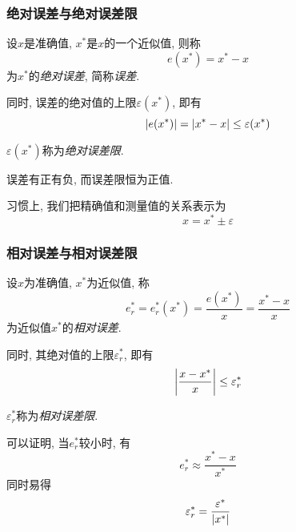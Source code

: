 \subsubsection{绝对误差与绝对误差限}
\begin{definition}[绝对误差与绝对误差限]
    设$x$是准确值, $x^*$是$x$的一个近似值, 则称
    \begin{equation*}
        e(x^*)=x^*-x
    \end{equation*}
    为$x^*$的\emph{绝对误差}, 简称\emph{误差}.

    同时, 误差的绝对值的上限$\varepsilon(x^*)$, 即有
    \begin{equation*}
        \abs{e(x^*)}=\abs{x^*-x}\le\varepsilon(x^*)
    \end{equation*}

    $\varepsilon(x^*)$称为\emph{绝对误差限}.
\end{definition}

\begin{notice}
    误差有正有负, 而误差限恒为正值.
\end{notice}

习惯上, 我们把精确值和测量值的关系表示为
\begin{equation*}
    x=x^*\pm\varepsilon
\end{equation*}

\subsubsection{相对误差与相对误差限}

\begin{definition}[相对误差与相对误差限]
    设$x$为准确值, $x^*$为近似值, 称
    \begin{equation*}
        e_r^*=e_r^*(x^*)=\frac{e(x^*)}{x}=\frac{x^*-x}{x}
    \end{equation*}
    为近似值$x^*$的\emph{相对误差}.

    同时, 其绝对值的上限$\varepsilon_r^*$, 即有
    \begin{equation*}
        \abs{\frac{x-x^*}{x}}\le \varepsilon_r^*
    \end{equation*}
    
    $\varepsilon_r^*$称为\emph{相对误差限}.
\end{definition}

可以证明, 当$e_r^*$较小时, 有
\begin{equation*}
    e_r^* \approx\frac{x^*-x}{x^*}
\end{equation*}
同时易得
\begin{equation*}
    \varepsilon_r^*=\frac{\varepsilon^*}{\abs{x^*}}
\end{equation*}

